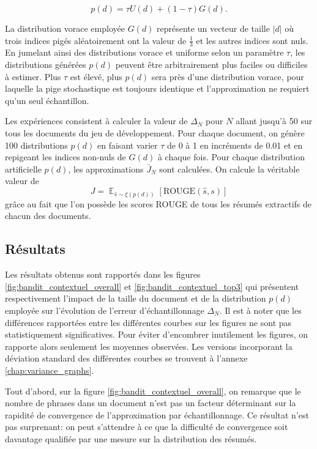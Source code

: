 \begin{equation*}
    p(d) = \tau U(d) + (1 - \tau) G(d).
\end{equation*}

La distribution vorace employée $G(d)$ représente un vecteur de taille $|d|$ où trois indices 
pigés aléatoirement ont la valeur de $\frac{1}{3}$ et les autres indices sont nuls.
En jumelant ainsi des distributions vorace et uniforme selon un paramètre $\tau$,
les distributions générées $p(d)$ peuvent être arbitrairement plus faciles ou difficiles 
à estimer.
Plus $\tau$ est élevé, plus $p(d)$ sera près d'une distribution 
vorace, pour laquelle la pige stochastique est toujours identique et l'approximation 
ne requiert qu'un seul échantillon.

Les expériences consistent à calculer la valeur de $\Delta_N$ pour $N$ 
allant jusqu'à 50 sur tous les documents du jeu de développement.
Pour chaque document, on génère 100 distributions $p(d)$
en faisant varier $\tau$ de 0 à 1 en incréments de 0.01 et en repigeant les indices 
non-nuls de $G(d)$ à chaque fois.
Pour chaque distribution artificielle $p(d)$, les approximations $\bar{J}_N$ sont
calculées.
On calcule la véritable valeur de 
\begin{equation*}
    J = \mathop\mathbb{E}_{\hat{s} \sim \xi(p(d))} [\text{ROUGE}(\hat{s}, s)]
\end{equation*}
 grâce au fait que l'on possède
les scores ROUGE de tous les résumés extractifs de chacun des documents.

\subsection{Résultats}
\label{subsec:results_bs}

Les résultats obtenus sont rapportés dans les figures \ref{fig:bandit_contextuel_overall}
et \ref{fig:bandit_contextuel_top3} qui présentent respectivement
l'impact de la taille du document et de la distribution $p(d)$ employée
sur l'évolution de l'erreur d'échantillonnage $\Delta_N$.
Il est à noter que les différences rapportées entre les différentes 
courbes sur les figures ne sont pas statistiquement significatives.
Pour éviter d'encombrer inutilement les figures, on rapporte alors 
seulement les moyennes observées.
Les versions incorporant la déviation standard des différentes courbes 
se trouvent à l'annexe \ref{chap:variance_graphs}.

Tout d'abord, sur la figure \ref{fig:bandit_contextuel_overall}, 
on remarque que le nombre de phrases dans un document n'est pas un
facteur déterminant sur la rapidité de convergence de l'approximation par échantillonnage.
Ce résultat n'est pas surprenant: on peut s'attendre à ce que la difficulté
de convergence soit davantage qualifiée par une mesure sur la distribution
des résumés.

